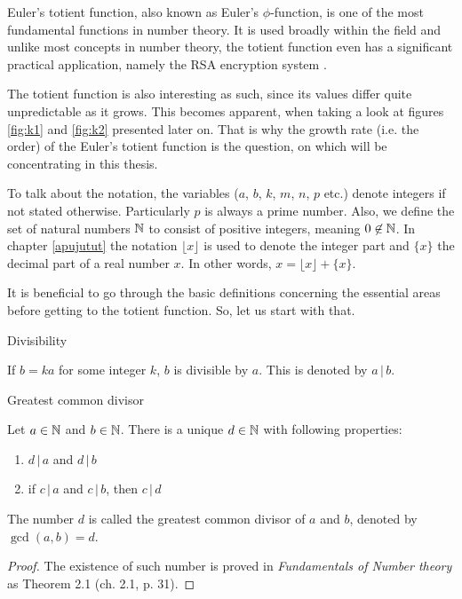 \documentclass{article}
\begin{document}
Euler's totient function, also known as Euler's $\phi$-function, is one of the most fundamental functions in number theory. It is used broadly within the field and unlike most concepts in number theory, the totient function even has a significant practical application, namely the RSA encryption system \cite{RSA}.

The totient function is also interesting as such, since its values differ quite unpredictable as it grows. This becomes apparent, when taking a look at figures \ref{fig:k1} and \ref{fig:k2} presented later on. That is why the growth rate (i.e. the order) of the Euler's totient function is the question, on which will be concentrating in this thesis.

To talk about the notation, the variables ($a$, $b$, $k$, $m$, $n$, $p$ etc.) denote integers if not stated otherwise. Particularly $p$ is always a prime number. Also, we define the set of natural numbers $\mathbb{N}$ to consist of positive integers, meaning $0 \not\in \mathbb{N}$. In chapter \ref{apujutut} the notation $\lfloor x\rfloor$ is used to denote the integer part and $\{x\}$ the decimal part of a real number $x$. In other words, $x=\lfloor x\rfloor+\{x\}$.

It is beneficial to go through the basic definitions concerning the essential areas before getting to the totient function. So, let us start with that.

\begin{definition}
Divisibility

If $b=ka$ for some integer $k$, $b$ is divisible by $a$. This is denoted by $a \,\vert\, b$.

\end{definition}

\begin{theorem}
Greatest common divisor

Let $a \in \mathbb{N}$ and $b \in \mathbb{N}$. There is a unique $d \in \mathbb{N}$ with following properties:

\begin{enumerate}
 \item $d \,\vert\, a$ and $d \,\vert\, b$
 \item if $c \,\vert\, a$ and $c \,\vert\, b$, then $c \,\vert\, d$
\end{enumerate}

The number $d$ is called the greatest common divisor of $a$ and $b$, denoted by $\gcd(a,b) = d$.

\begin{proof}
The existence of such number is proved in \textit{Fundamentals of Number theory} \cite{LeVeque} as Theorem 2.1 (ch. 2.1, p. 31).
\end{proof}
\end{theorem}
\end{document}

